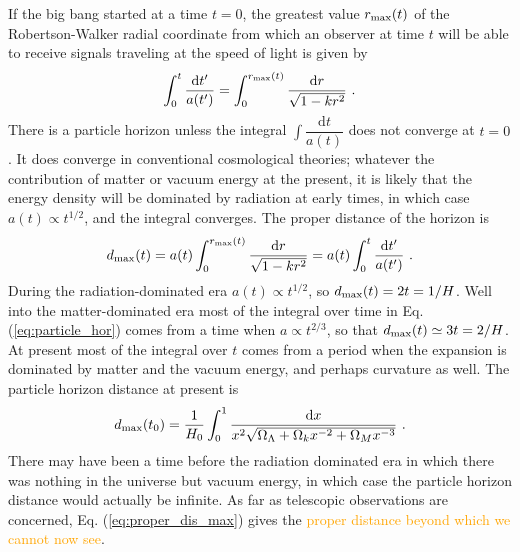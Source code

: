 \documentclass[12pt,a4paper]{article}
\newcommand{\dif}{\mathrm{d}}
\newcounter{theo}[section]\setcounter{theo}{0}
\begin{document}
If the big bang started at a time $t = 0$, the greatest value \textcolor{red}{$r_{\rm max}(t)$} of the Robertson-Walker radial coordinate from which an observer at time $t$ will be able to receive signals traveling at the speed of light is given by
\begin{equation}
\int_0^t \dfrac{\dif t^\prime}{a(t^\prime)} = \int_0^{r_{\rm max}(t)} \dfrac{\dif r}{\sqrt{1-kr^2} } ~.
\label{eq:particle_hor}
\end{equation}
There is a particle horizon unless the integral $\displaystyle \int \dfrac{\dif t}{a(t)}$ does not converge at $t = 0$. It does converge in conventional cosmological theories; whatever the contribution of matter or vacuum energy at the present, it is likely that the energy density will be dominated by radiation at early times, in which case $a(t) \propto t^{1/2}$, and the integral converges. The proper distance of the horizon is 
\begin{equation}
d_{\rm max}(t) = a(t) \int_0^{r_{\rm max}(t) } \dfrac{\dif r}{\sqrt{1-kr^2} }= a(t) \int_0^t \dfrac{\dif t^\prime}{a(t^\prime)} ~.
\end{equation}
During the radiation-dominated era $a(t) \propto t^{1/2}$, so $d_{\rm max}(t) = 2t = 1/H$. Well into the matter-dominated era most of the integral over time in Eq. (\ref{eq:particle_hor}) comes from a time when $a \propto t^{2/3}$, so that $d_{\rm max}(t) \simeq 3t = 2/H$. At present most of the integral over $t$ comes from a period when the expansion is dominated by matter and the vacuum energy, and perhaps curvature as well. The particle horizon distance at present is
\begin{equation}
d_{\rm max}(t_0) = \dfrac{1}{H_0} \int_0^1 \dfrac{\dif x}{x^2 \sqrt{\Omega_\Lambda +\Omega_k x^{-2} +\Omega_Mx^{-3}} } ~.
\label{eq:proper_dis_max}
\end{equation}
There may have been a time before the radiation dominated era in which there was nothing in the universe but vacuum energy,
in which case the particle horizon distance would actually be infinite. As far as telescopic observations are concerned, Eq. (\ref{eq:proper_dis_max}) gives the \textcolor{orange}{proper distance beyond which we cannot now see}.
\end{document}
